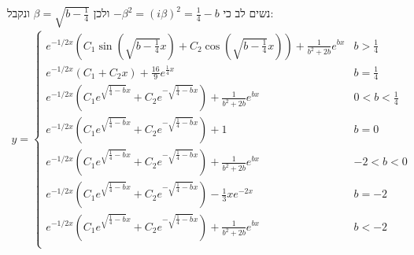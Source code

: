 \documentclass{article}
\begin{document}
נשים לב כי $-\beta^2=(i\beta)^2=\frac{1}{4}-b$ ולכן $\beta=\sqrt{b-\frac{1}{4}}$ ונקבל:
\begin{align*}
    y=\begin{cases}
          e^{-1/2x}(C_1\sin(\sqrt{b-\frac{1}{4}}x) + C_2\cos(\sqrt{b-\frac{1}{4}}x))+\frac{1}{b^2+2b}e^{bx} & b>\frac{1}{4}   \\
          e^{-1/2x}(C_1+C_2x)+\frac{16}{9}e^{\frac{1}{4}x}                                                  & b=\frac{1}{4}   \\
          e^{-1/2x}(C_1e^{\sqrt{\frac{1}{4}-b}x}+C_2e^{-\sqrt{\frac{1}{4}-b}x})+\frac{1}{b^2+2b}e^{bx}      & 0<b<\frac{1}{4} \\
          e^{-1/2x}(C_1e^{\sqrt{\frac{1}{4}-b}x}+C_2e^{-\sqrt{\frac{1}{4}-b}x})+1                           & b=0             \\
          e^{-1/2x}(C_1e^{\sqrt{\frac{1}{4}-b}x}+C_2e^{-\sqrt{\frac{1}{4}-b}x})+\frac{1}{b^2+2b}e^{bx}      & -2<b<0          \\
          e^{-1/2x}(C_1e^{\sqrt{\frac{1}{4}-b}x}+C_2e^{-\sqrt{\frac{1}{4}-b}x})-\frac{1}{3}xe^{-2x}         & b=-2            \\
          e^{-1/2x}(C_1e^{\sqrt{\frac{1}{4}-b}x}+C_2e^{-\sqrt{\frac{1}{4}-b}x})+\frac{1}{b^2+2b}e^{bx}      & b<-2            \\
      \end{cases}
\end{align*}

\pagebreak
\end{document}
